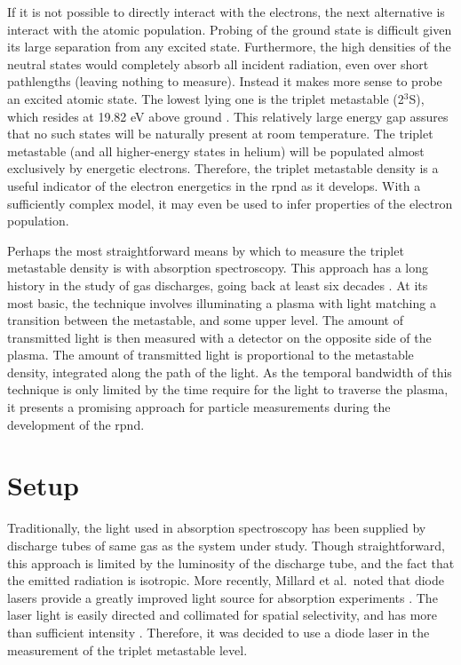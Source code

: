 If it is not possible to directly interact with the electrons, the next
alternative is interact with the atomic population. Probing of the ground state
is difficult given its large separation from any excited state. Furthermore, the
high densities of the neutral states would completely absorb all incident
radiation, even over short pathlengths (leaving nothing to measure). Instead it
makes more sense to probe an excited atomic state. The lowest lying one is the
triplet metastable (2$^3$S), which resides at 19.82 eV above ground
\cite{Kramida2012}. This relatively large energy gap assures that no such states
will be naturally present at room temperature. The triplet metastable (and all
higher-energy states in helium) will be populated almost exclusively by
energetic electrons. Therefore, the triplet metastable density is a useful
indicator of the electron energetics in the \acs{rpnd} as it develops. With a
sufficiently complex model, it may even be used to infer properties of the
electron population.

Perhaps the most straightforward means by which to measure the triplet
metastable density is with absorption spectroscopy. This approach has a long
history in the study of gas discharges, going back at least six decades
\cite{Phelps1953}. At its most basic, the technique involves illuminating a
plasma with light matching a transition between the metastable, and some upper
level. The amount of transmitted light is then measured with a detector on the
opposite side of the plasma. The amount of transmitted light is proportional to
the metastable density, integrated along the path of the light. As the temporal
bandwidth of this technique is only limited by the time require for the light to
traverse the plasma, it presents a promising approach for particle measurements
during the development of the \acs{rpnd}.

\section{Setup}

Traditionally, the light used in absorption spectroscopy has been supplied by
discharge tubes of same gas as the system under study. Though straightforward,
this approach is limited by the luminosity of the discharge tube, and the fact
that the emitted radiation is isotropic. More recently, Millard et al.\ noted
that diode lasers provide a greatly improved light source for absorption
experiments \cite{Millard1998}. The laser light is easily directed and
collimated for spatial selectivity, and has more than sufficient intensity
\cite{Millard1998}. Therefore, it was decided to use a diode laser in the
measurement of the triplet metastable level.

